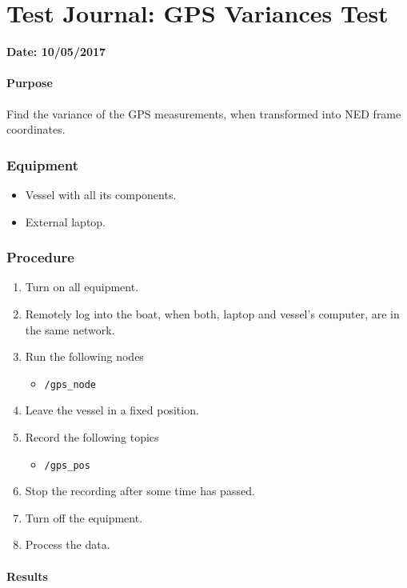 \chapter{Test Journal: GPS Variances Test} \label{app:GPSVariances}

\textbf{Date: 10/05/2017}

\subsubsection*{Purpose}
Find the variance of the GPS measurements, when transformed into NED frame coordinates.

\subsection*{Equipment}
\begin{itemize}
    \item Vessel with all its components. 
    \item External laptop.
\end{itemize}

\subsection*{Procedure}
\begin{enumerate}
    \item Turn on all equipment.
    \item Remotely log into the boat, when both, laptop and vessel's computer, are in the same network.
    \item Run the following nodes
    \begin{itemize}
        \item \lstinline[style=cinline]{/gps_node}
    \end{itemize}
    \item Leave the vessel in a fixed position.
    \item Record the following topics
    \begin{itemize}
        \item \lstinline[style=cinline]{/gps_pos}      
    \end{itemize}
    \item Stop the recording after some time has passed.
    \item Turn off the equipment.
    \item Process the data.
\end{enumerate}

\subsubsection*{Results}
